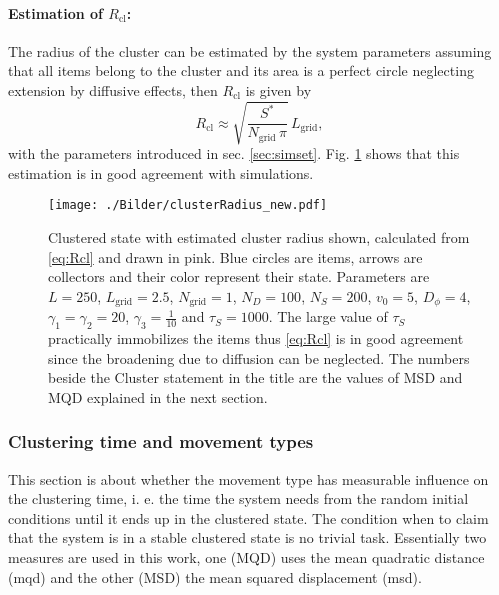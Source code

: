 
\paragraph{Estimation of $R_\text{cl}$:}

The radius of the cluster can be estimated by the system parameters assuming that all items belong to the cluster and its area is a perfect circle neglecting extension by diffusive effects, then $R_\text{cl}$ is given by
%
\begin{equation}
 R_\text{cl}\approx\sqrt{\frac{S^*}{N_\text{grid}\,\pi}}\,L_\text{grid},
 \label{eq:Rcl}
\end{equation}
%
with the parameters introduced in sec. \ref{sec:simset}. Fig. \ref{fig:Rcl} shows that this estimation is in good agreement with simulations.
%
\begin{figure}[H]
\centering
  \texttt{[image: ./Bilder/clusterRadius\_new.pdf]}
\caption{
    Clustered state with estimated cluster radius shown, calculated from \eqref{eq:Rcl} and drawn in pink.
    Blue circles are items, arrows are collectors and their color represent their state.
    Parameters are $L=250$, $L_\text{grid}=2.5$, $N_\text{grid}=1$, $N_D=100$, $N_S=200$, $v_0=5$, $D_\phi=4$, $\gamma_1=\gamma_2=20$, $\gamma_3=\frac{1}{10}$ and $\tau_S=1000$.
    The large value of $\tau_S$ practically immobilizes the items thus \eqref{eq:Rcl} is in good agreement since the broadening due to diffusion can be neglected.
    The numbers beside the Cluster statement in the title are the values of MSD and MQD explained in the next section.
}
\label{fig:Rcl}
\end{figure}

\subsubsection{Clustering time and movement types}

This section is about whether the movement type has measurable influence on the clustering time, i. e. the time the system needs from the random initial conditions until it ends up in the clustered state.
The condition when to claim that the system is in a stable clustered state is no trivial task. Essentially two measures are used in this work, one (MQD) uses the mean quadratic distance (mqd) and the other (MSD) the mean squared displacement (msd).

